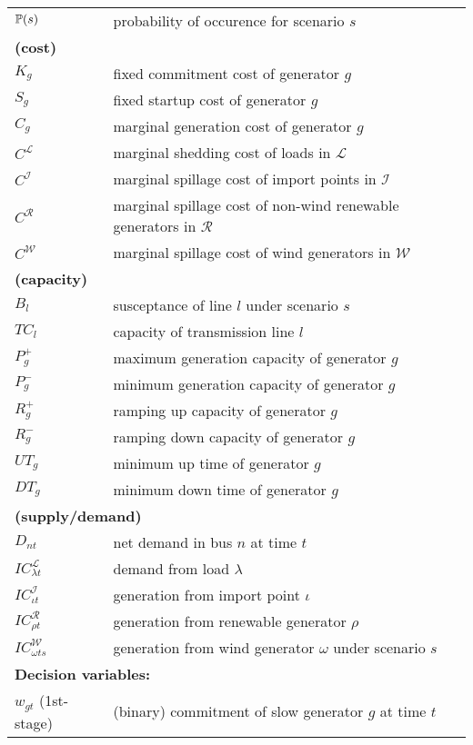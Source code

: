 \begin{table}[H]
{\begin{tabular}{ll}
			$\operatorname*{\mathbb{P}}(s)$	&probability of occurence for scenario $s$\\
			\multicolumn{2}{l}{\textbf{(cost)}} \\
			$K_g$ & fixed commitment cost of generator $g$ \\
			$S_g$ & fixed startup cost of generator $g$\\
			$C_g$ & marginal generation cost of generator $g$	\\
			$C^\mathcal{L}$ & marginal shedding cost of loads in $\mathcal{L}$	\\
			$C^\mathcal{I}$ & marginal spillage cost of import points in $\mathcal{I}$ \\
			$C^\mathcal{R}$ & marginal spillage cost of non-wind  renewable generators in $\mathcal{R}$ \\ 
			$C^\mathcal{W}$ & marginal spillage cost of wind generators in $\mathcal{W}$ \\
			\multicolumn{2}{l}{\textbf{(capacity)}} \\
			$B_{l}$ & susceptance of line $l$ under scenario $s$\\
			$TC_l$ & capacity of transmission line $l$\\
			$P_{g}^+$ & maximum generation capacity of generator $g$\\
			$P_{g}^-$ & minimum generation capacity of generator $g$ \\
			$R_{g}^+$ & ramping up capacity of generator $g$\\
			$R_{g}^-$ & ramping down capacity of generator $g$\\
			$UT_{g}$ & minimum up time of generator $g$\\
			$DT_{g}$ & minimum down time of generator $g$\\
			\multicolumn{2}{l}{\textbf{(supply/demand)}} \\
			$D_{nt}$ & net demand in bus $n$ at time $t$ \\
			$IC_{\lambda t}^\mathcal{L}$ & demand from load $\lambda$\\
			$IC_{\iota t}^\mathcal{I}$ & generation from import point $\iota$\\
			$IC_{\rho t}^\mathcal{R}$ & generation from renewable generator $\rho$\\
			$IC_{\omega ts}^\mathcal{W}$ & generation from wind generator $\omega$ under scenario $s$\\ \midrule
			\multicolumn{2}{l}{\textbf{Decision variables:}} \\
			$w_{gt}$ (1st-stage) 	& (binary) commitment of slow generator $g$ at time $t$\\

\end{tabular}}
\end{table}
